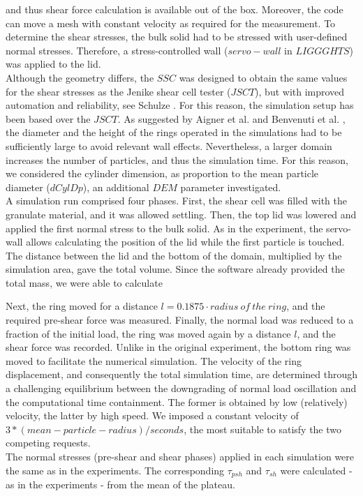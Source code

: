 \begin{appendix}
and thus shear force calculation is available out of the box. Moreover, the code can move a mesh with constant 
velocity as required for the measurement. To determine the shear stresses, the bulk solid had to be stressed with 
user-defined normal stresses. Therefore, a stress-controlled wall ($servo-wall$ in $LIGGGHTS$) was applied to the lid. \\
Although the geometry differs, the $SSC$ was designed to obtain the same values for the shear stresses as the 
Jenike shear cell tester ($JSCT$), but with improved automation and reliability,
see Schulze \cite{RefWorks:118}. 
For this reason, the simulation setup has been
based over the $JSCT$.
As suggested by Aigner et al. \cite{RefWorks:139} and Benvenuti et al. \cite{RefWorks:173}, 
the diameter and the height of the rings operated in the simulations had to be sufficiently large to avoid relevant wall effects. 
Nevertheless, a larger domain increases the number of particles, and thus the simulation time. 
For this reason, we considered the cylinder dimension, as proportion to the mean particle diameter ($dCylDp$), 
an additional $DEM$ parameter investigated. \\   
A simulation run comprised four phases. 
First, the shear cell was filled with the granulate material, and it was allowed
settling.
Then, the top lid was lowered and applied the first normal stress to the bulk solid. 
As in the experiment, the servo-wall allows calculating the position of the lid
while the first particle is touched. 
The distance between the lid and the bottom of the domain, multiplied by the 
simulation area, gave the total volume.
Since the software already provided the total mass, we were able to calculate

Next, the ring moved for a distance $l=0.1875 \cdot radius ~of ~the ~ring$, and the required pre-shear force was measured. 
Finally, the normal load was reduced to a fraction of the initial load, 
the ring was moved again by a distance $l$, and the shear force was recorded. 
Unlike in the original experiment, the bottom ring was moved to facilitate the numerical simulation. 
The velocity of the ring displacement, and consequently the total simulation time, are determined 
through a challenging equilibrium between the downgrading of normal load oscillation and the computational time containment. 
The former is obtained by low (relatively) velocity, the latter by high speed. We imposed a constant velocity 
of $3*(mean-particle-radius)/seconds$, the most suitable to satisfy the two competing requests. \\
The normal stresses (pre-shear and shear phases) applied in each simulation were the same as in the experiments. 
The corresponding $\tau_{psh}$ and $\tau_{sh}$ were calculated - as in the experiments - from the mean of the plateau.\\


\end{appendix}

